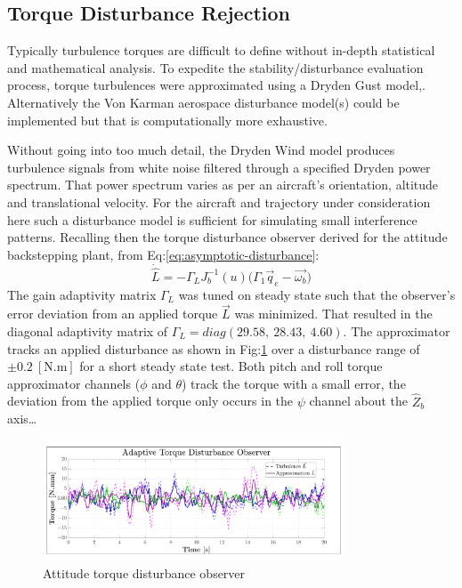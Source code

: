\subsection{Torque Disturbance Rejection}
\label{subsec:simulation.disturbance.torque}
Typically  turbulence torques are difficult to define without in-depth statistical and mathematical analysis. To expedite the stability/disturbance evaluation process, torque turbulences were approximated using a Dryden Gust model,\cite{optimalgust,discretegustmodel}. Alternatively the Von Karman aerospace disturbance model(s) could be implemented but that is computationally more exhaustive.
\par
Without going into too much detail, the Dryden Wind model produces turbulence signals from white noise filtered through a specified Dryden power spectrum. That power spectrum varies as per an aircraft's orientation, altitude and translational velocity. For the aircraft and trajectory under consideration here such a disturbance model is sufficient for simulating small interference patterns. Recalling then the torque disturbance observer derived for the attitude backstepping plant, from Eq:\ref{eq:asymptotic-disturbance}:
\begin{equation}\label{eq:stability-torque-overserver}
\dot{\hat{L}}=-\Gamma_L J_b^{-1}(u)\big(\Gamma_1\vec{q}_e-\vec{\omega_b}\big)
\end{equation}
The gain adaptivity matrix $\Gamma_L$ was tuned on steady state such that the observer's error deviation from an applied torque $\vec{L}$ was minimized. That resulted in the diagonal adaptivity matrix of $\Gamma_L=diag(29.58,~28.43,~4.60)$. The approximator tracks an applied disturbance as shown in Fig:\ref{fig:torque-observer} over a disturbance range of $\pm 0.2~[\text{N.m}]$ for a short steady state test. Both pitch and roll torque approximator channels ($\phi$ and $\theta$) track the torque with a small error, the deviation from the applied torque only occurs in the $\psi$ channel about the $\hat{Z}_b$ axis\ldots
\begin{figure}[htbp]
\vspace{-12pt}
\centering
\includegraphics[width=0.8\textwidth]{graphs/torque-observer}
\vspace{-12pt}
\caption{Attitude torque disturbance observer}
\vspace{-16pt}
\label{fig:torque-observer}
\end{figure}
